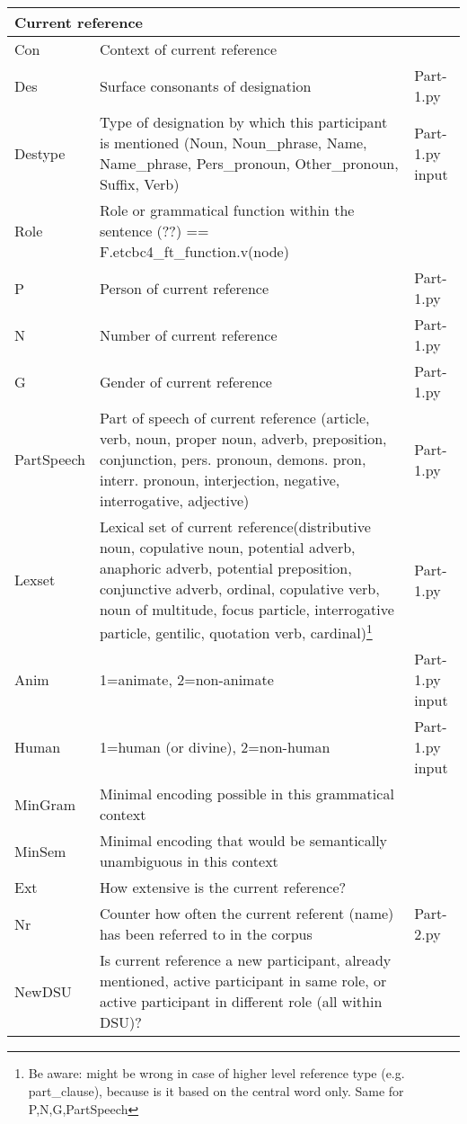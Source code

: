 \documentclass{article}
\begin{document}
\begin{longtable}{|l|p{}|l|}
\multicolumn{3}{|l|}{\bf{Current reference}} \\ \hline

Con & Context of current reference & \\ \hline
Des & Surface consonants of designation & Part-1.py \\ \hline
Destype & Type of designation by which this participant is mentioned (Noun, Noun\_phrase, Name, Name\_phrase, Pers\_pronoun, Other\_pronoun,  Suffix, Verb) & Part-1.py input \\ \hline
Role & Role or grammatical function within the sentence (??) == F.etcbc4\_ft\_function.v(node) & \\ \hline
P & Person of current reference & Part-1.py \\ \hline
N & Number of current reference & Part-1.py \\ \hline
G & Gender of current reference & Part-1.py \\ \hline
PartSpeech & Part of speech of current reference (article, verb, noun, proper noun, adverb, preposition, conjunction, pers. pronoun, demons. pron, interr. pronoun, interjection, negative, interrogative, adjective) & Part-1.py \\ \hline
Lexset & Lexical set of current reference(distributive noun, copulative noun, potential adverb, anaphoric adverb, potential preposition, conjunctive adverb, ordinal, copulative verb, noun of multitude, focus particle, interrogative particle, gentilic, quotation verb, cardinal)\footnote{Be aware: might be wrong in case of higher level reference type (e.g. part\_clause), because is it based on the central word only. Same for P,N,G,PartSpeech} & Part-1.py \\ \hline
Anim & 1=animate, 2=non-animate & Part-1.py input \\ \hline
Human & 1=human (or divine), 2=non-human & Part-1.py input \\ \hline
MinGram & Minimal encoding possible in this grammatical context & \\ \hline
MinSem & Minimal encoding that would be semantically unambiguous in this context & \\ \hline
Ext & How extensive is the current reference? & \\ \hline
Nr & Counter how often the current referent (name) has been referred to in the corpus & Part-2.py \\ \hline
NewDSU & Is current reference a new participant, already mentioned, active participant in same role, or active participant in different role (all within DSU)?  & \\ \hline

\end{longtable}
\end{document}
